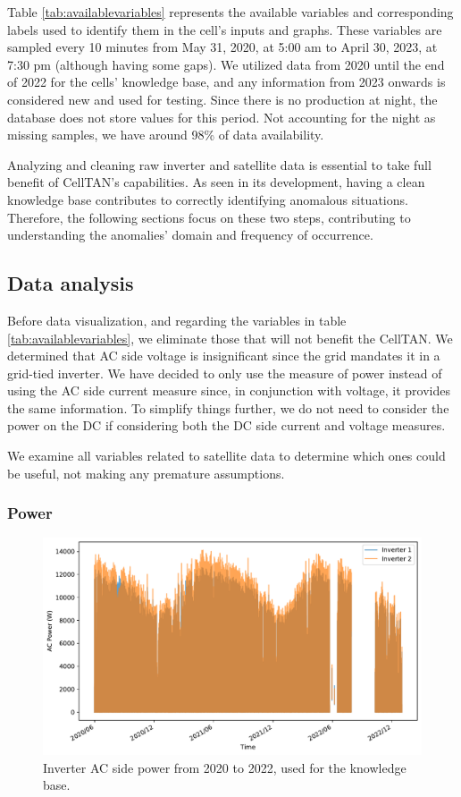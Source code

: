 Table \ref{tab:availablevariables} represents the available variables and corresponding labels used to identify them in the cell's inputs and graphs. These variables are sampled every 10 minutes from May 31, 2020, at 5:00 am to April 30, 2023, at 7:30 pm (although having some gaps). We utilized data from 2020 until the end of 2022 for the cells' knowledge base, and any information from 2023 onwards is considered new and used for testing. Since there is no production at night, the database does not store values for this period. Not accounting for the night as missing samples, we have around 98\% of data availability.

Analyzing and cleaning raw inverter and satellite data is essential to take full benefit of CellTAN's capabilities. As seen in its development, having a clean knowledge base contributes to correctly identifying anomalous situations. Therefore, the following sections focus on these two steps, contributing to understanding the anomalies' domain and frequency of occurrence.

\subsection{Data analysis}

Before data visualization, and regarding the variables in table \ref{tab:availablevariables}, we eliminate those that will not benefit the CellTAN. We determined that AC side voltage is insignificant since the grid mandates it in a grid-tied inverter. We have decided to only use the measure of power instead of using the AC side current measure since, in conjunction with voltage, it provides the same information. To simplify things further, we do not need to consider the power on the DC if considering both the DC side current and voltage measures.

We examine all variables related to satellite data to determine which ones could be useful, not making any premature assumptions.

\subsubsection{Power}


\begin{figure}[h!]
    \centering
    \includegraphics[width=\textwidth]{figures/chapter5/analysis/00_power_kb.pdf}
    \caption{Inverter AC side power from 2020 to 2022, used for the knowledge base.}
    \label{fig:eda_power_kb}
\end{figure}

